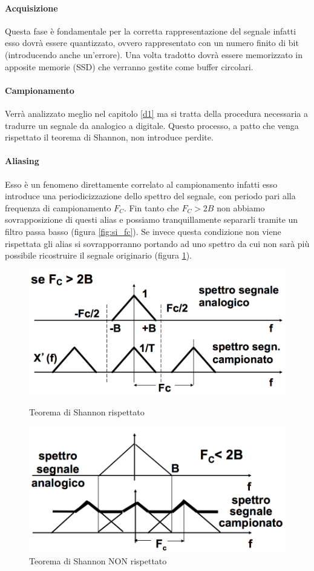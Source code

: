 \documentclass[12pt]{article}
\begin{document}
\paragraph{Acquisizione} Questa fase è fondamentale per la corretta rappresentazione del segnale infatti esso dovrà essere quantizzato, ovvero rappresentato con un numero finito di bit (introducendo anche un'errore). Una volta tradotto dovrà essere memorizzato in apposite memorie (SSD) che verranno gestite come buffer circolari.
\paragraph{Campionamento} Verrà analizzato meglio nel capitolo \ref{d1} ma si tratta della procedura necessaria a tradurre un segnale da analogico a digitale. Questo processo, a patto che venga rispettato il teorema di Shannon, non introduce perdite.
\paragraph{Aliasing} Esso è un fenomeno direttamente correlato al campionamento infatti esso introduce una periodicizzazione dello spettro del segnale, con periodo pari alla frequenza di campionamento $F_{C}$. Fin tanto che $F_{C}>2B$ non abbiamo sovrapposizione di questi alias e possiamo tranquillamente separarli tramite un filtro passa basso (figura \ref{fig:si_fc}). Se invece questa condizione non viene rispettata gli alias si sovrapporranno portando ad uno spettro da cui non sarà più possibile ricostruire il segnale originario (figura \ref{fig:no_fc}).

\begin{figure}[!hpt]
  \includegraphics[width=\textwidth]{images/si_fc.png}
  \caption{Teorema di Shannon rispettato}
  \label{fig:si_fc}
  \includegraphics[width=\textwidth]{images/no_fc.png}
  \caption{Teorema di Shannon NON rispettato}
  \label{fig:no_fc}
\end{figure}
\end{document}
